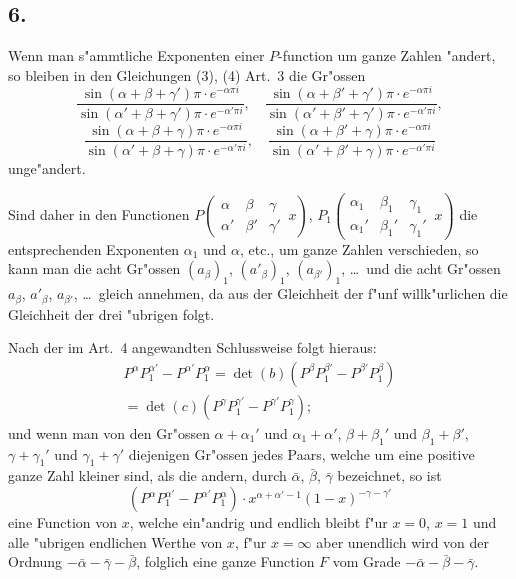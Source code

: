 \documentclass[12pt,a4paper]{article}
\begin{document}
\subsection*{6.}

Wenn man s{"a}mmtliche Exponenten einer $P$-function um ganze Zahlen {"a}ndert, so bleiben in den Gleichungen (3), (4) Art.~3 die Gr{"o}ssen
\[
\frac{\sin(\alpha + \beta + \gamma')\pi \cdot e^{-\alpha\pi i}}{\sin(\alpha' + \beta + \gamma')\pi \cdot e^{-\alpha'\pi i}}, \quad
\frac{\sin(\alpha + \beta' + \gamma')\pi \cdot e^{-\alpha\pi i}}{\sin(\alpha' + \beta' + \gamma')\pi \cdot e^{-\alpha'\pi i}},
\]
\[
\frac{\sin(\alpha + \beta + \gamma)\pi \cdot e^{-\alpha\pi i}}{\sin(\alpha' + \beta + \gamma)\pi \cdot e^{-\alpha'\pi i}}, \quad
\frac{\sin(\alpha + \beta' + \gamma)\pi \cdot e^{-\alpha\pi i}}{\sin(\alpha' + \beta' + \gamma)\pi \cdot e^{-\alpha'\pi i}}
\]
unge{"a}ndert.

Sind daher in den Functionen $P\left(\begin{array}{ccc|} \alpha & \beta & \gamma \\ \alpha' & \beta' & \gamma' \end{array}\, x\right)$, $P_1\left(\begin{array}{ccc|} \alpha_1 & \beta_1 & \gamma_1 \\ \alpha_1' & \beta_1' & \gamma_1' \end{array}\, x\right)$ die entsprechenden Exponenten $\alpha_1$ und $\alpha$, etc., um ganze Zahlen verschieden, so kann man die acht Gr{"o}ssen $(a_{\beta})_1$, $(a'_{\beta})_1$, $(a_{\beta'})_1$, \dots\ und die acht Gr{"o}ssen $a_{\beta}$, $a'_{\beta}$, $a_{\beta'}$, \dots\ gleich annehmen, da aus der Gleichheit der f{"u}nf willk{"u}rlichen die Gleichheit der drei {"u}brigen folgt.

Nach der im Art.~4 angewandten Schlussweise folgt hieraus:
\begin{multline*}
P^{\alpha} P_1^{\alpha'} - P^{\alpha'} P_1^{\alpha} = \det(b)(P^{\beta} P_1^{\beta'} - P^{\beta'} P_1^{\beta}) \\
= \det(c)(P^{\gamma} P_1^{\gamma'} - P^{\gamma'} P_1^{\gamma});
\end{multline*}
und wenn man von den Gr{"o}ssen $\alpha + \alpha_1'$ und $\alpha_1 + \alpha'$, $\beta + \beta_1'$ und $\beta_1 + \beta'$, $\gamma + \gamma_1'$ und $\gamma_1 + \gamma'$ diejenigen Gr{"o}ssen jedes Paars, welche um eine positive ganze Zahl kleiner sind, als die andern, durch $\bar{\alpha}$, $\bar{\beta}$, $\bar{\gamma}$ bezeichnet, so ist
\[
(P^{\alpha} P_1^{\alpha'} - P^{\alpha'} P_1^{\alpha}) \cdot x^{\alpha+\alpha'-1} (1-x)^{-\gamma-\gamma'}
\]
eine Function von $x$, welche ein{"a}ndrig und endlich bleibt f{"u}r $x = 0$, $x = 1$ und alle {"u}brigen endlichen Werthe von $x$, f{"u}r $x = \infty$ aber unendlich wird von der Ordnung $-\bar{\alpha} - \bar{\gamma} - \bar{\beta}$, folglich eine ganze Function $F$ vom Grade $-\bar{\alpha} - \bar{\beta} - \bar{\gamma}$.
\end{document}
